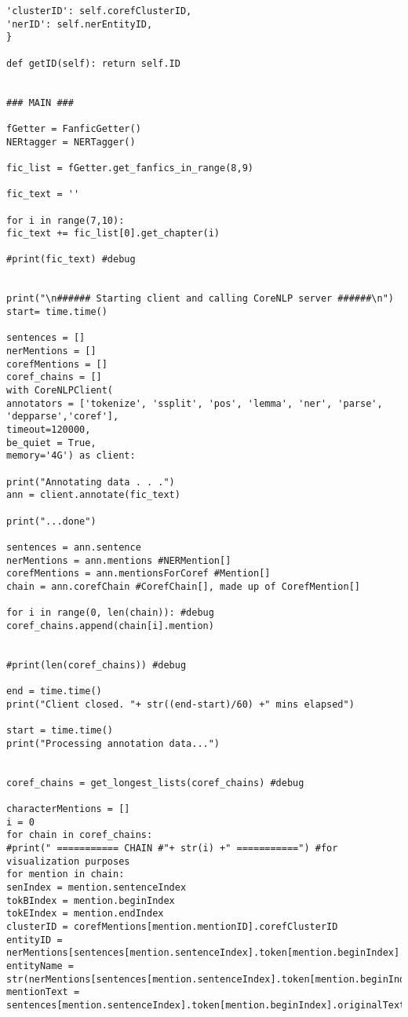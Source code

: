\documentclass{pre-tfg}
\begin{document}
\begin{lstlisting}[style=consola]
'clusterID': self.corefClusterID,
'nerID': self.nerEntityID,
}

def getID(self): return self.ID


### MAIN ###

fGetter = FanficGetter()
NERtagger = NERTagger()

fic_list = fGetter.get_fanfics_in_range(8,9)

fic_text = ''

for i in range(7,10):
fic_text += fic_list[0].get_chapter(i)

#print(fic_text) #debug


print("\n###### Starting client and calling CoreNLP server ######\n")
start= time.time()

sentences = []
nerMentions = []
corefMentions = []
coref_chains = []
with CoreNLPClient(
annotators = ['tokenize', 'ssplit', 'pos', 'lemma', 'ner', 'parse', 'depparse','coref'],
timeout=120000,
be_quiet = True,
memory='4G') as client:	

print("Annotating data . . .")
ann = client.annotate(fic_text)

print("...done")

sentences = ann.sentence
nerMentions = ann.mentions #NERMention[]
corefMentions = ann.mentionsForCoref #Mention[]
chain = ann.corefChain #CorefChain[], made up of CorefMention[]

for i in range(0, len(chain)): #debug
coref_chains.append(chain[i].mention)


#print(len(coref_chains)) #debug

end = time.time()
print("Client closed. "+ str((end-start)/60) +" mins elapsed")

start = time.time()
print("Processing annotation data...")


coref_chains = get_longest_lists(coref_chains) #debug

characterMentions = []
i = 0
for chain in coref_chains:
#print(" =========== CHAIN #"+ str(i) +" ===========") #for visualization purposes
for mention in chain:
senIndex = mention.sentenceIndex
tokBIndex = mention.beginIndex
tokEIndex = mention.endIndex
clusterID = corefMentions[mention.mentionID].corefClusterID
entityID = nerMentions[sentences[mention.sentenceIndex].token[mention.beginIndex].entityMentionIndex].canonicalEntityMentionIndex
entityName = str(nerMentions[sentences[mention.sentenceIndex].token[mention.beginIndex].entityMentionIndex].entityMentionText)
mentionText = sentences[mention.sentenceIndex].token[mention.beginIndex].originalText


\end{lstlisting}
\end{document}
